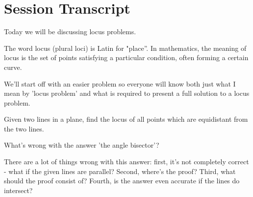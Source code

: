 \section{Session Transcript}
Today we will be discussing locus problems.

The word locus (plural loci) is Latin for "place”. In mathematics, the meaning of locus is the set of points satisfying a particular condition, often forming a certain curve.

We'll start off with an easier problem so everyone will know both just what I mean by 'locus problem' and what is required to present a full solution to a locus problem.


\begin{example}
    Given two lines in a plane, find the locus of all points which are equidistant from the two lines.
\end{example}

What's wrong with the answer 'the angle bisector'?










There are a lot of things wrong with this answer: first, it's not completely correct - what if the given lines are parallel? Second, where's the proof? Third, what should the proof consist of? Fourth, is the answer even accurate if the lines do intersect?

